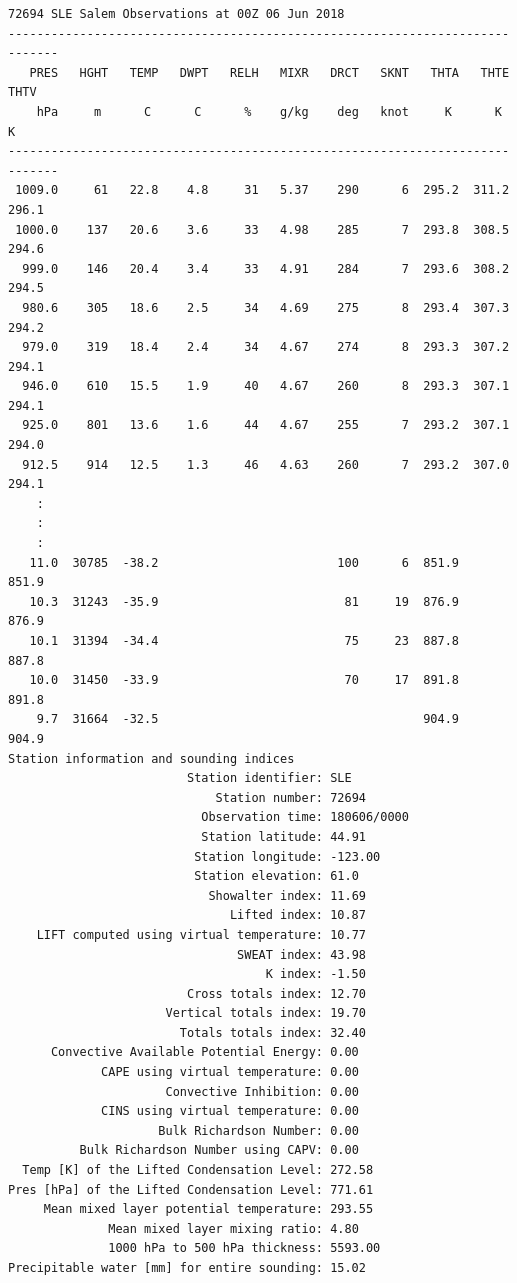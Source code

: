 \documentclass[11pt]{article}   %
\begin{document}
\begin{verbatim}
72694 SLE Salem Observations at 00Z 06 Jun 2018
-----------------------------------------------------------------------------
   PRES   HGHT   TEMP   DWPT   RELH   MIXR   DRCT   SKNT   THTA   THTE   THTV
    hPa     m      C      C      %    g/kg    deg   knot     K      K      K
-----------------------------------------------------------------------------
 1009.0     61   22.8    4.8     31   5.37    290      6  295.2  311.2  296.1
 1000.0    137   20.6    3.6     33   4.98    285      7  293.8  308.5  294.6
  999.0    146   20.4    3.4     33   4.91    284      7  293.6  308.2  294.5
  980.6    305   18.6    2.5     34   4.69    275      8  293.4  307.3  294.2
  979.0    319   18.4    2.4     34   4.67    274      8  293.3  307.2  294.1
  946.0    610   15.5    1.9     40   4.67    260      8  293.3  307.1  294.1
  925.0    801   13.6    1.6     44   4.67    255      7  293.2  307.1  294.0
  912.5    914   12.5    1.3     46   4.63    260      7  293.2  307.0  294.1
    :
    :
    :
   11.0  30785  -38.2                         100      6  851.9         851.9
   10.3  31243  -35.9                          81     19  876.9         876.9
   10.1  31394  -34.4                          75     23  887.8         887.8
   10.0  31450  -33.9                          70     17  891.8         891.8
    9.7  31664  -32.5                                     904.9         904.9
Station information and sounding indices
                         Station identifier: SLE
                             Station number: 72694
                           Observation time: 180606/0000
                           Station latitude: 44.91
                          Station longitude: -123.00
                          Station elevation: 61.0
                            Showalter index: 11.69
                               Lifted index: 10.87
    LIFT computed using virtual temperature: 10.77
                                SWEAT index: 43.98
                                    K index: -1.50
                         Cross totals index: 12.70
                      Vertical totals index: 19.70
                        Totals totals index: 32.40
      Convective Available Potential Energy: 0.00
             CAPE using virtual temperature: 0.00
                      Convective Inhibition: 0.00
             CINS using virtual temperature: 0.00
                     Bulk Richardson Number: 0.00
          Bulk Richardson Number using CAPV: 0.00
  Temp [K] of the Lifted Condensation Level: 272.58
Pres [hPa] of the Lifted Condensation Level: 771.61
     Mean mixed layer potential temperature: 293.55
              Mean mixed layer mixing ratio: 4.80
              1000 hPa to 500 hPa thickness: 5593.00
Precipitable water [mm] for entire sounding: 15.02
\end{verbatim}
\end{document}
